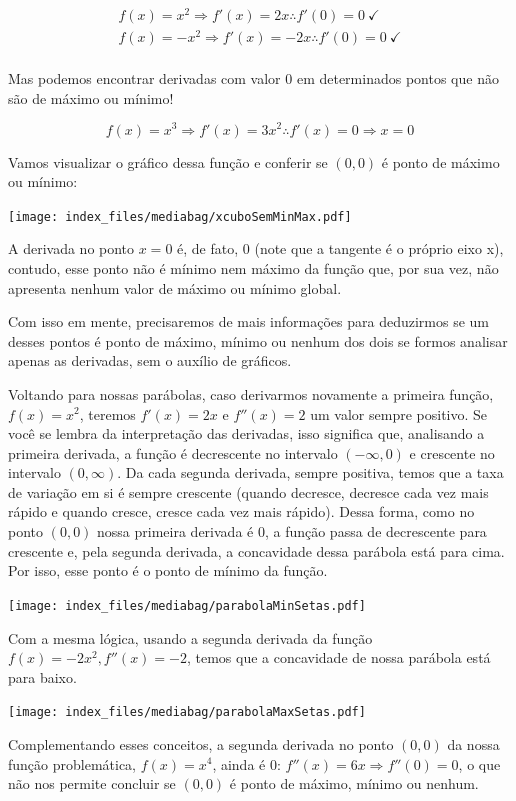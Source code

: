 \documentclass[
  letterpaper,
  DIV=11,
  numbers=noendperiod]{scrreprt}
\begin{document}
\[
\begin{aligned}
    f(x) = x^2 \Rightarrow f'(x) = 2x \therefore f'(0) = 0~ \checkmark \\
    f(x) = -x^2 \Rightarrow f'(x) = -2x \therefore f'(0) = 0 ~\checkmark \\
\end{aligned}
\]

Mas podemos encontrar derivadas com valor 0 em determinados pontos que
não são de máximo ou mínimo!

\[
f(x) = x^3 \Rightarrow f'(x) = 3x^2 \therefore f'(x) = 0 \Rightarrow x = 0
\]

Vamos visualizar o gráfico dessa função e conferir se \((0,0)\) é ponto
de máximo ou mínimo:

\texttt{[image: index\_files/mediabag/xcuboSemMinMax.pdf]}

A derivada no ponto \(x=0\) é, de fato, \(0\) (note que a tangente é o
próprio eixo x), contudo, esse ponto não é mínimo nem máximo da função
que, por sua vez, não apresenta nenhum valor de máximo ou mínimo global.

Com isso em mente, precisaremos de mais informações para deduzirmos se
um desses pontos é ponto de máximo, mínimo ou nenhum dos dois se formos
analisar apenas as derivadas, sem o auxílio de gráficos.

Voltando para nossas parábolas, caso derivarmos novamente a primeira
função, \(f(x) = x^2\), teremos \(f'(x) = 2x\) e \(f''(x) = 2\) um valor
sempre positivo. Se você se lembra da interpretação das derivadas, isso
significa que, analisando a primeira derivada, a função é decrescente no
intervalo \((-\infty, 0)\) e crescente no intervalo \((0, \infty)\). Da
cada segunda derivada, sempre positiva, temos que a taxa de variação em
si é sempre crescente (quando decresce, decresce cada vez mais rápido e
quando cresce, cresce cada vez mais rápido). Dessa forma, como no ponto
\((0,0)\) nossa primeira derivada é 0, a função passa de decrescente
para crescente e, pela segunda derivada, a concavidade dessa parábola
está para cima. Por isso, esse ponto é o ponto de mínimo da função.

\texttt{[image: index\_files/mediabag/parabolaMinSetas.pdf]}

Com a mesma lógica, usando a segunda derivada da função
\(f(x) = -2x^2, f''(x) = -2\), temos que a concavidade de nossa parábola
está para baixo.

\texttt{[image: index\_files/mediabag/parabolaMaxSetas.pdf]}

Complementando esses conceitos, a segunda derivada no ponto \((0,0)\) da
nossa função problemática, \(f(x) = x^4\), ainda é 0:
\(f''(x) = 6x \Rightarrow f''(0) =0\), o que não nos permite concluir se
\((0,0)\) é ponto de máximo, mínimo ou nenhum.
\end{document}

